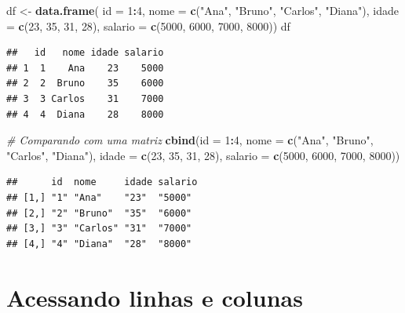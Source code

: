 \documentclass[
]{book}
\newenvironment{Shaded}{\begin{snugshade}}{\end{snugshade}}
\newcommand{\AttributeTok}[1]{\textcolor[rgb]{0.13,0.29,0.53}{#1}}
\newcommand{\CommentTok}[1]{\textcolor[rgb]{0.56,0.35,0.01}{\textit{#1}}}
\newcommand{\DecValTok}[1]{\textcolor[rgb]{0.00,0.00,0.81}{#1}}
\newcommand{\FunctionTok}[1]{\textcolor[rgb]{0.13,0.29,0.53}{\textbf{#1}}}
\newcommand{\NormalTok}[1]{#1}
\newcommand{\OtherTok}[1]{\textcolor[rgb]{0.56,0.35,0.01}{#1}}
\newcommand{\SpecialCharTok}[1]{\textcolor[rgb]{0.81,0.36,0.00}{\textbf{#1}}}
\newcommand{\StringTok}[1]{\textcolor[rgb]{0.31,0.60,0.02}{#1}}
\theoremstyle{definition}
\theoremstyle{definition}
\theoremstyle{definition}
\theoremstyle{definition}
\theoremstyle{remark}
\begin{document}
\begin{Shaded}
\begin{Highlighting}[]
\NormalTok{df }\OtherTok{\textless{}{-}} \FunctionTok{data.frame}\NormalTok{(}
\AttributeTok{id =} \DecValTok{1}\SpecialCharTok{:}\DecValTok{4}\NormalTok{,}
\AttributeTok{nome =} \FunctionTok{c}\NormalTok{(}\StringTok{"Ana"}\NormalTok{, }\StringTok{"Bruno"}\NormalTok{, }\StringTok{"Carlos"}\NormalTok{, }\StringTok{"Diana"}\NormalTok{),}
\AttributeTok{idade =} \FunctionTok{c}\NormalTok{(}\DecValTok{23}\NormalTok{, }\DecValTok{35}\NormalTok{, }\DecValTok{31}\NormalTok{, }\DecValTok{28}\NormalTok{),}
\AttributeTok{salario =} \FunctionTok{c}\NormalTok{(}\DecValTok{5000}\NormalTok{, }\DecValTok{6000}\NormalTok{, }\DecValTok{7000}\NormalTok{, }\DecValTok{8000}\NormalTok{))}
\NormalTok{df}
\end{Highlighting}
\end{Shaded}

\begin{verbatim}
##   id   nome idade salario
## 1  1    Ana    23    5000
## 2  2  Bruno    35    6000
## 3  3 Carlos    31    7000
## 4  4  Diana    28    8000
\end{verbatim}

\begin{Shaded}
\begin{Highlighting}[]
\CommentTok{\# Comparando com uma matriz}
\FunctionTok{cbind}\NormalTok{(}\AttributeTok{id =} \DecValTok{1}\SpecialCharTok{:}\DecValTok{4}\NormalTok{,}
\AttributeTok{nome =} \FunctionTok{c}\NormalTok{(}\StringTok{"Ana"}\NormalTok{, }\StringTok{"Bruno"}\NormalTok{, }\StringTok{"Carlos"}\NormalTok{, }\StringTok{"Diana"}\NormalTok{),}
\AttributeTok{idade =} \FunctionTok{c}\NormalTok{(}\DecValTok{23}\NormalTok{, }\DecValTok{35}\NormalTok{, }\DecValTok{31}\NormalTok{, }\DecValTok{28}\NormalTok{),}
\AttributeTok{salario =} \FunctionTok{c}\NormalTok{(}\DecValTok{5000}\NormalTok{, }\DecValTok{6000}\NormalTok{, }\DecValTok{7000}\NormalTok{, }\DecValTok{8000}\NormalTok{))}
\end{Highlighting}
\end{Shaded}

\begin{verbatim}
##      id  nome     idade salario
## [1,] "1" "Ana"    "23"  "5000" 
## [2,] "2" "Bruno"  "35"  "6000" 
## [3,] "3" "Carlos" "31"  "7000" 
## [4,] "4" "Diana"  "28"  "8000"
\end{verbatim}

\section{Acessando linhas e colunas}\label{acessando-linhas-e-colunas}
\end{document}
